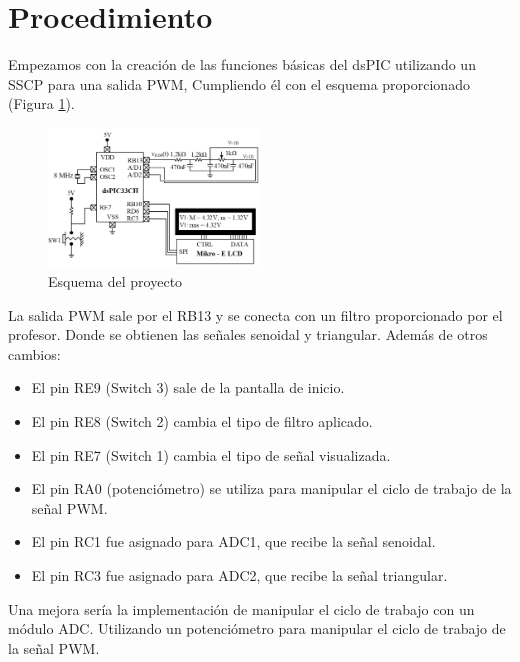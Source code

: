 \documentclass{article}
\begin{document}
\section{Procedimiento}
Empezamos con la creación de las funciones básicas del dsPIC utilizando un SSCP para una salida PWM, Cumpliendo él con el esquema proporcionado (Figura \ref{fig:esquema}).
\begin{figure}[H]
    \centering
    \includegraphics[width=0.5\textwidth]{images/esquema_og.png} %
    \caption{Esquema del proyecto}
    \label{fig:esquema}
\end{figure}
La salida PWM sale por el RB13 y se conecta con un filtro proporcionado por el profesor. Donde se obtienen las señales senoidal y triangular.
Además de otros cambios:
\begin{itemize}
    \item El pin RE9 (Switch 3) sale de la pantalla de inicio.
    \item El pin RE8 (Switch 2) cambia el tipo de filtro aplicado.
    \item El pin RE7 (Switch 1) cambia el tipo de señal visualizada.
    \item El pin RA0 (potenciómetro) se utiliza para manipular el ciclo de trabajo de la señal PWM.
    \item El pin RC1 fue asignado para ADC1, que recibe la señal senoidal.
    \item El pin RC3 fue asignado para ADC2, que recibe la señal triangular.
\end{itemize}
    Una mejora sería la implementación de manipular el ciclo de trabajo con un módulo ADC. Utilizando un potenciómetro para manipular el ciclo de trabajo de la señal PWM.
\end{document}
